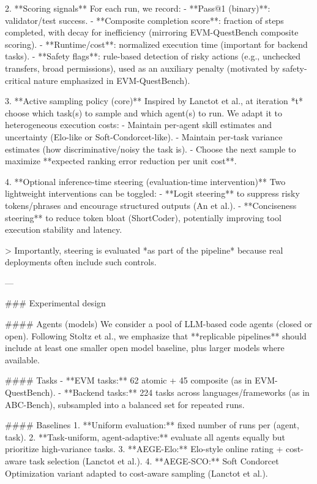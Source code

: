 2. **Scoring signals**  
   For each run, we record:
   - **Pass@1 (binary)**: validator/test success.  
   - **Composite completion score**: fraction of steps completed, with decay for inefficiency (mirroring EVM-QuestBench composite scoring).  
   - **Runtime/cost**: normalized execution time (important for backend tasks).  
   - **Safety flags**: rule-based detection of risky actions (e.g., unchecked transfers, broad permissions), used as an auxiliary penalty (motivated by safety-critical nature emphasized in EVM-QuestBench).

3. **Active sampling policy (core)**  
   Inspired by Lanctot et al., at iteration *t* choose which task(s) to sample and which agent(s) to run. We adapt it to heterogeneous execution costs:
   - Maintain per-agent skill estimates and uncertainty (Elo-like or Soft-Condorcet-like).
   - Maintain per-task variance estimates (how discriminative/noisy the task is).
   - Choose the next sample to maximize **expected ranking error reduction per unit cost**.

4. **Optional inference-time steering (evaluation-time intervention)**  
   Two lightweight interventions can be toggled:
   - **Logit steering** to suppress risky tokens/phrases and encourage structured outputs (An et al.).  
   - **Conciseness steering** to reduce token bloat (ShortCoder), potentially improving tool execution stability and latency.

> Importantly, steering is evaluated *as part of the pipeline* because real deployments often include such controls.

---

### Experimental design  

#### Agents (models)  
We consider a pool of LLM-based code agents (closed or open). Following Stoltz et al., we emphasize that **replicable pipelines** should include at least one smaller open model baseline, plus larger models where available.

#### Tasks  
- **EVM tasks:** 62 atomic + 45 composite (as in EVM-QuestBench).  
- **Backend tasks:** 224 tasks across languages/frameworks (as in ABC-Bench), subsampled into a balanced set for repeated runs.

#### Baselines  
1. **Uniform evaluation:** fixed number of runs per (agent, task).  
2. **Task-uniform, agent-adaptive:** evaluate all agents equally but prioritize high-variance tasks.  
3. **AEGE-Elo:** Elo-style online rating + cost-aware task selection (Lanctot et al.).  
4. **AEGE-SCO:** Soft Condorcet Optimization variant adapted to cost-aware sampling (Lanctot et al.).  

